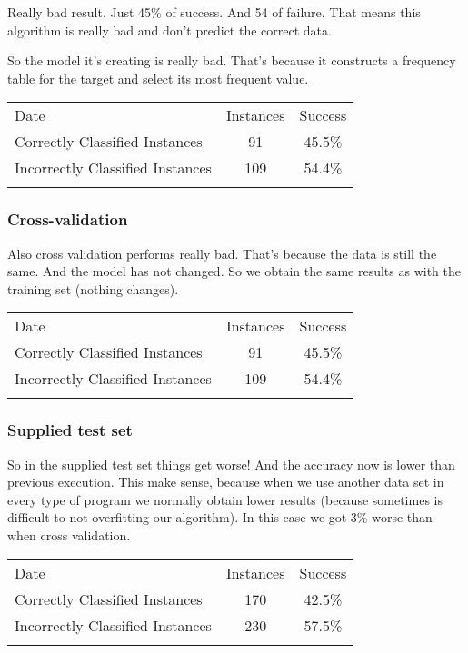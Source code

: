 \documentclass[]{article}
\begin{document}
Really bad result. Just 45\% of success. And 54 of failure. That means
this algorithm is really bad and don't predict the correct data.

So the model it's creating is really bad. That's because it constructs a
frequency table for the target and select its most frequent value.

\begin{longtable}[c]{@{}lcc@{}}
\toprule\addlinespace
Date & Instances & Success
\\\addlinespace
\midrule\endhead
Correctly Classified Instances & 91 & 45.5\%
\\\addlinespace
Incorrectly Classified Instances & 109 & 54.4\%
\\\addlinespace
\bottomrule
\end{longtable}

\subsubsection{Cross-validation}\label{cross-validation-1}

Also cross validation performs really bad. That's because the data is
still the same. And the model has not changed. So we obtain the same
results as with the training set (nothing changes).

\begin{longtable}[c]{@{}lcc@{}}
\toprule\addlinespace
Date & Instances & Success
\\\addlinespace
\midrule\endhead
Correctly Classified Instances & 91 & 45.5\%
\\\addlinespace
Incorrectly Classified Instances & 109 & 54.4\%
\\\addlinespace
\bottomrule
\end{longtable}

\subsubsection{Supplied test set}\label{supplied-test-set-1}

So in the supplied test set things get worse! And the accuracy now is
lower than previous execution. This make sense, because when we use
another data set in every type of program we normally obtain lower
results (because sometimes is difficult to not overfitting our
algorithm). In this case we got 3\% worse than when cross validation.

\begin{longtable}[c]{@{}lcc@{}}
\toprule\addlinespace
Date & Instances & Success
\\\addlinespace
\midrule\endhead
Correctly Classified Instances & 170 & 42.5\%
\\\addlinespace
Incorrectly Classified Instances & 230 & 57.5\%
\\\addlinespace
\bottomrule
\end{longtable}
\end{document}

